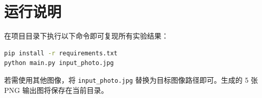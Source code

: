 \documentclass[12pt,a4paper]{ctexart}
\begin{document}
\section{运行说明}

在项目目录下执行以下命令即可复现所有实验结果：

\begin{lstlisting}[language=bash, caption={运行命令}]
pip install -r requirements.txt
python main.py input_photo.jpg
\end{lstlisting}

若需使用其他图像，将 \texttt{input\_photo.jpg} 替换为目标图像路径即可。生成的 5 张 PNG 输出图将保存在当前目录。
\end{document}
